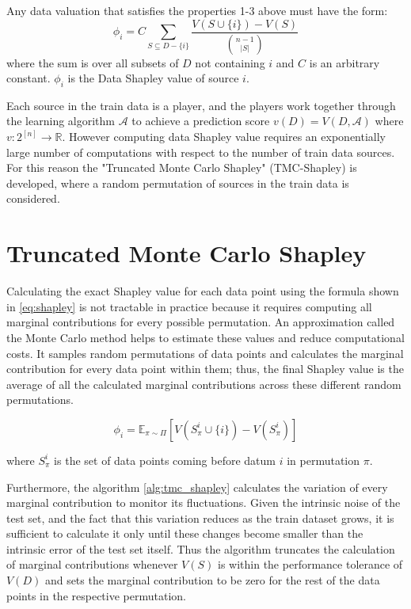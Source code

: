 \documentclass[pdflatex,sn-mathphys-num]{sn-jnl}
\begin{document}
Any data valuation that satisfies the properties 1-3 above must have the form:
\begin{equation} \label{eq:shapley}
\displaystyle \phi_i = C \sum_{S \subseteq D - \{i\}} \frac{V(S \cup \{i\}) - V(S)}{\binom{n-1}{|S|}}
\end{equation}
where the sum is over all subsets of $D$ not containing $i$ and $C$ is an arbitrary constant. 
$\phi_i$ is the Data Shapley value of source $i$.

Each source in the train data is a player, and the players work together through the learning algorithm $\mathscr{A}$ to achieve a prediction score $v(D) = V (D, \mathscr{A})$ where $v:2^{[n]} \to \mathbb{R}$.
However computing data Shapley value requires an exponentially large number of computations
with respect to the number of train data sources. For this reason the "Truncated Monte Carlo Shapley" (TMC-Shapley) is developed, where a random permutation of sources in the train data is considered.
\section{Truncated Monte Carlo Shapley}

Calculating the exact Shapley value for each data point using the formula shown in \ref{eq:shapley} is not tractable in practice because it requires computing all marginal contributions 
for every possible permutation. An approximation called the Monte Carlo method helps to estimate these values and reduce computational costs. It samples random permutations of data points 
and calculates the marginal contribution for every data point within them; thus, the final Shapley value is the average of all the calculated marginal contributions across these different 
random permutations.

$$\phi_i = \mathbb{E}_{\pi \sim \Pi} [V(S_{\pi}^i \cup \{i\}) - V(S_{\pi}^i)]$$ 

where $S^i_{\pi}$ is the set of data points coming before datum $i$ in permutation $\pi$.

Furthermore, the algorithm \ref{alg:tmc_shapley} calculates the variation of every marginal contribution to monitor its fluctuations.
Given the intrinsic noise of the test set, and the fact that this variation reduces as the train dataset grows,
it is sufficient to calculate it only until these changes become smaller than the intrinsic error of the test set itself.
Thus the algorithm truncates the calculation of marginal contributions whenever $V(S)$ is within the performance tolerance of $V(D)$ and
sets the marginal contribution to be zero for the rest of the data points in the respective permutation.
\end{document}
